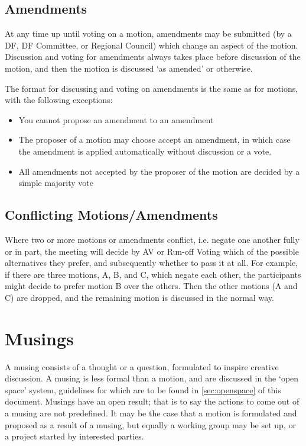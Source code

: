 \documentclass[a4paper, 12pt]{article} %
\begin{document}
\subsection{Amendments}
At any time up until voting on a motion, amendments may be submitted (by a DF, DF Committee, or Regional Council) which change an aspect of the motion.  Discussion and voting for amendments always takes place before discussion of the motion, and then the motion is discussed `as amended' or otherwise.

The format for discussing and voting on amendments is the same as for motions, with the following exceptions:
\begin{itemize}
\item You cannot propose an amendment to an amendment
\item The proposer of a motion may choose accept an amendment, in which case the amendment is applied automatically without discussion or a vote.
\item All amendments not accepted by the proposer of the motion are decided by a simple majority vote
\end{itemize}

\subsection{Conflicting Motions/Amendments}
\label{sec:conflicting}
Where two or more motions or amendments conflict, i.e. negate one another fully or in part, the meeting will decide by AV or Run-off Voting which of the possible alternatives they prefer, and subsequently whether to pass it at all.  For example, if there are three motions, A, B, and C, which negate each other, the participants might decide to prefer motion B over the others.  Then the other motions (A and C) are dropped, and the remaining motion is discussed in the normal way.

\section{Musings}
A musing consists of a thought or a question, formulated to inspire creative discussion.  A musing is less formal than a motion, and are discussed in the `open space' system, guidelines for which are to be found in \autoref{sec:openspace} of this document.  Musings have an open result; that is to say the actions to come out of a musing are not predefined.  It may be the case that a motion is formulated and proposed as a result of a musing, but equally a working group may be set up, or a project started by interested parties.
\end{document}
